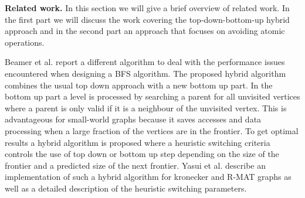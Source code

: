 \documentclass[letterpaper]{article}
\newcommand{\mypar}[1]{{\bf #1.}} %
\begin{document}

	\mypar{Related work} 
	In this section we will give a brief overview of related work. In the first part we will discuss the work covering the top-down-bottom-up hybrid approach and in the second part an approach that focuses on avoiding atomic operations.
	
	Beamer et al.\cite{beamer2011searching} report a different algorithm to deal with the performance issues encountered when designing a BFS algorithm. The proposed hybrid algorithm combines the usual top down approach with a new bottom up part. In the bottom up part a level is processed by searching a parent for all unvisited vertices where a parent is only valid if it is a neighbour of the unvisited vertex. This is advantageous for small-world graphs because it saves accesses and data processing when a large fraction of the vertices are in the frontier. To get optimal results a hybrid algorithm is proposed where a heuristic switching criteria controls the use of top down or bottom up step depending on the size of the frontier and a predicted size of the next frontier. Yasui et al.\cite{6691600} describe an implementation of such a hybrid algorithm for kronecker and R-MAT graphs as well as a detailed description of the heuristic switching parameters.
	
\end{document}
